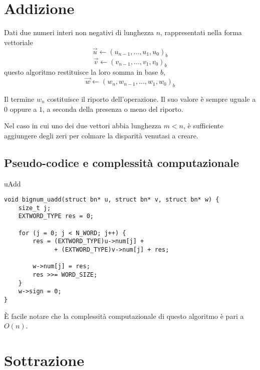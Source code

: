 \clearpage
%
%
\section{Addizione}
%
%

Dati due numeri interi non negativi di lunghezza $n$, rappresentati nella forma vettoriale
$$\vec{u} \gets \left(u_{n-1}, \dots, u_1, u_0\right)_b$$
$$\vec{v} \gets \left(v_{n-1}, \dots, v_1, v_0\right)_b$$
questo algoritmo restituisce la loro somma in base $b$,
$$\vec{w} \gets \left(w_n, w_{n-1}, \dots, w_1, w_0\right)_b$$

Il termine $w_n$ costituisce il riporto dell'operazione. Il suo valore è sempre uguale a $0$ oppure a $1$, a seconda della presenza o meno del riporto.
	
Nel caso in cui uno dei due vettori abbia lunghezza $m < n$, è sufficiente aggiungere degli zeri per colmare la disparità venutasi a creare.

%
\subsection{Pseudo-codice e complessità computazionale}
%

\begin{algorithm}[H]
	\caption{uAdd}
	\label{alg:uAdd}
	\DontPrintSemicolon
\end{algorithm}

\begin{lstlisting}[basicstyle=\ttfamily\small, backgroundcolor=\color{bgCode}]
void bignum_uadd(struct bn* u, struct bn* v, struct bn* w) {
    size_t j;
    EXTWORD_TYPE res = 0;
    
    for (j = 0; j < N_WORD; j++) {
        res = (EXTWORD_TYPE)u->num[j] + 
              + (EXTWORD_TYPE)v->num[j] + res;
        
        w->num[j] = res;
        res >>= WORD_SIZE;
    }
    w->sign = 0;
}
\end{lstlisting}

È facile notare che la complessità computazionale di questo algoritmo è pari a $O(n)$.
\clearpage
%
%
\section{Sottrazione}
%
%

